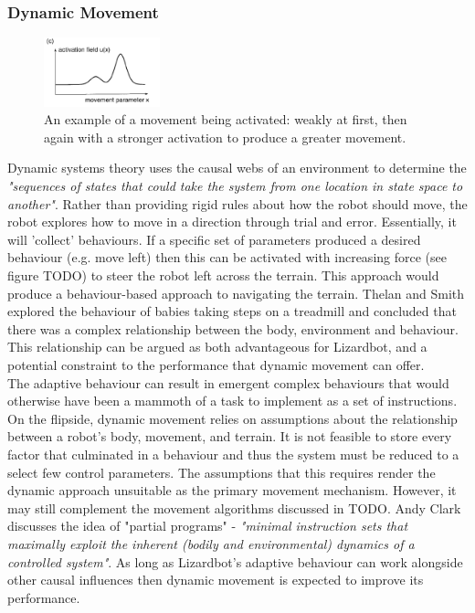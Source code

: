 \documentclass{article}
\begin{document}
\subsubsection{Dynamic Movement}
\begin{figure}
    \centering
    \vspace*{-5mm}
    \includegraphics[width=0.3\textwidth]{activationExample}
    \caption{An example of a movement being activated: weakly at first, then again with a stronger activation to produce a greater movement. \citep{dft}}
\end{figure}
Dynamic systems theory uses the causal webs of an environment to determine the \textit{"sequences of states that could take the system from one location in state space to another"}. 
Rather than providing rigid rules about how the robot should move, the robot explores how to move in a direction through trial and error. Essentially, it will 'collect' behaviours. If a specific set of parameters produced a desired behaviour (e.g. move left) then this can be activated with increasing force (see figure TODO) to steer the robot left across the terrain. This approach would produce a behaviour-based approach to navigating the terrain. Thelan and Smith explored the behaviour of babies taking steps on a treadmill and concluded that there was a complex relationship between the body, environment and behaviour.  This relationship can be argued as both advantageous for Lizardbot, and a potential constraint to the performance that dynamic movement can offer.\\
The adaptive behaviour can result in emergent complex behaviours that would otherwise have been a mammoth of a task to implement as a set of instructions. On the flipside, dynamic movement relies on assumptions about the relationship between a robot's body, movement, and terrain. It is not feasible to store every factor that culminated in a behaviour and thus the system must be reduced to a select few control parameters. The assumptions that this requires render the dynamic approach unsuitable as the primary movement mechanism. However, it may still complement the movement algorithms discussed in TODO. Andy Clark discusses the idea of "partial programs"  - \textit{"minimal instruction sets that maximally exploit the inherent (bodily and environmental) dynamics of a controlled system"}.  As long as Lizardbot's adaptive behaviour can work alongside other causal influences then dynamic movement is expected to improve its performance.
 
\end{document}
